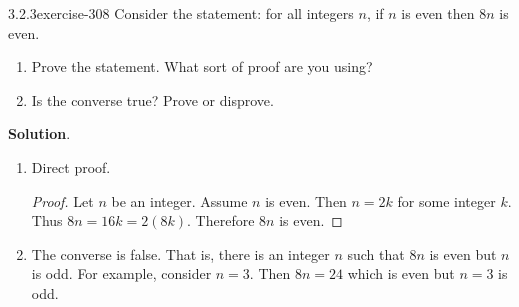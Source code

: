 \documentclass[twoside,11pt,]{book}
\numberwithin{equation}{chapter}
\begin{document}
\begin{divisionsolution}{3.2.3}{}{exercise-308}%
\hypertarget{p-4124}{}%
Consider the statement: for all integers \(n\), if \(n\) is even then \(8n\) is even.\leavevmode%
\begin{enumerate}[label=(\alph*)]
\item\hypertarget{li-2129}{}\hypertarget{p-4125}{}%
Prove the statement. What sort of proof are you using?%
\item\hypertarget{li-2130}{}\hypertarget{p-4126}{}%
Is the converse true? Prove or disprove.%
\end{enumerate}
%
\par\smallskip%
\noindent\textbf{Solution}.\quad%
\hypertarget{p-4127}{}%
\leavevmode%
\begin{enumerate}[label=(\alph*)]
\item\hypertarget{li-2131}{}\hypertarget{p-4128}{}%
Direct proof. \begin{proof}{}
\hypertarget{p-4129}{}%
Let \(n\) be an integer. Assume \(n\) is even. Then \(n = 2k\) for some integer \(k\). Thus \(8n = 16k = 2(8k)\). Therefore \(8n\) is even.%
\end{proof}
%
\item\hypertarget{li-2132}{}\hypertarget{p-4130}{}%
The converse is false. That is, there is an integer \(n\) such that \(8n\) is even but \(n\) is odd. For example, consider \(n = 3\). Then \(8n = 24\) which is even but \(n = 3\) is odd.%
\end{enumerate}
%
\end{divisionsolution}%
\end{document}
